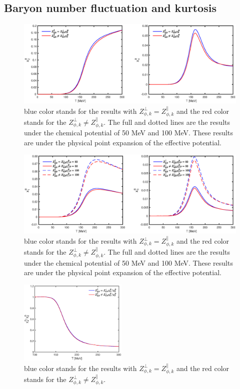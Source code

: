 \documentclass[%
reprint,
superscriptaddress,
showpacs,preprintnumbers,
 amsmath,amssymb,
 aps,
prd,
]{revtex4-1}
\begin{document}


\subsection{Baryon number fluctuation and kurtosis}
\begin{figure}[t]
\label{fig:chi2chi4}
\includegraphics[width=1.0\textwidth]{chi2chi4.eps}
\caption{blue color stands for the results with $Z^{\bot}_{\phi,k}=Z^{\|}_{\phi,k}$ and the red color stands for the $Z^{\bot}
_{\phi,k}\neq Z^{\|}_{\phi,k} $. The full and dotted lines are the results under the chemical potential of 50 MeV and 100 
MeV. These results are under the physical point expansion of the effective potential. }
\end{figure}



\begin{figure}[t]
\label{fig:chi13}
\includegraphics[width=1.0\textwidth]{chi13.eps}
\caption{blue color stands for the results with $Z^{\bot}_{\phi,k}=Z^{\|}_{\phi,k}$ and the red color stands for the $Z^{\bot}
_{\phi,k}\neq Z^{\|}_{\phi,k} $. The full and dotted lines are the results under the chemical potential of 50 MeV and 100 
MeV. These results are under the physical point expansion of the effective potential. }
\end{figure}




\begin{figure}[t]
\includegraphics[width=0.46\textwidth]{r42.eps}
\caption{blue color stands for the results with $Z^{\bot}_{\phi,k}=Z^{\|}_{\phi,k}$ and the red color stands for the $Z^{\bot}
_{\phi,k}\neq Z^{\|}_{\phi,k} $.}
\label{fig:r42}
\end{figure}
\end{document}
